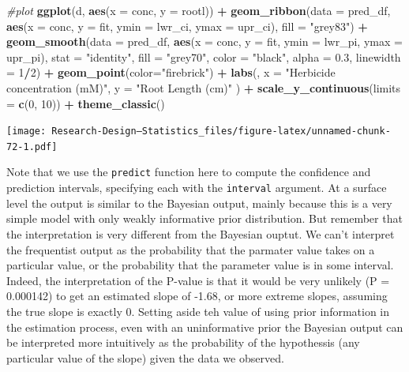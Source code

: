 \documentclass[
]{book}
\newenvironment{Shaded}{\begin{snugshade}}{\end{snugshade}}
\newcommand{\AttributeTok}[1]{\textcolor[rgb]{0.13,0.29,0.53}{#1}}
\newcommand{\CommentTok}[1]{\textcolor[rgb]{0.56,0.35,0.01}{\textit{#1}}}
\newcommand{\DecValTok}[1]{\textcolor[rgb]{0.00,0.00,0.81}{#1}}
\newcommand{\FloatTok}[1]{\textcolor[rgb]{0.00,0.00,0.81}{#1}}
\newcommand{\FunctionTok}[1]{\textcolor[rgb]{0.13,0.29,0.53}{\textbf{#1}}}
\newcommand{\NormalTok}[1]{#1}
\newcommand{\SpecialCharTok}[1]{\textcolor[rgb]{0.81,0.36,0.00}{\textbf{#1}}}
\newcommand{\StringTok}[1]{\textcolor[rgb]{0.31,0.60,0.02}{#1}}
\begin{document}
\begin{Shaded}
\begin{Highlighting}[]
\CommentTok{\#plot}
\FunctionTok{ggplot}\NormalTok{(d, }\FunctionTok{aes}\NormalTok{(}\AttributeTok{x =}\NormalTok{ conc, }\AttributeTok{y =}\NormalTok{ rootl)) }\SpecialCharTok{+}
  \FunctionTok{geom\_ribbon}\NormalTok{(}\AttributeTok{data =}\NormalTok{ pred\_df, }
              \FunctionTok{aes}\NormalTok{(}\AttributeTok{x =}\NormalTok{ conc, }\AttributeTok{y =}\NormalTok{ fit, }\AttributeTok{ymin =}\NormalTok{ lwr\_ci, }\AttributeTok{ymax =}\NormalTok{ upr\_ci),}
              \AttributeTok{fill =} \StringTok{"grey83"}\NormalTok{) }\SpecialCharTok{+}
  \FunctionTok{geom\_smooth}\NormalTok{(}\AttributeTok{data =}\NormalTok{ pred\_df,}
              \FunctionTok{aes}\NormalTok{(}\AttributeTok{x =}\NormalTok{ conc, }\AttributeTok{y =}\NormalTok{ fit, }\AttributeTok{ymin =}\NormalTok{ lwr\_pi, }\AttributeTok{ymax =}\NormalTok{ upr\_pi),}
              \AttributeTok{stat =} \StringTok{"identity"}\NormalTok{,}
              \AttributeTok{fill =} \StringTok{"grey70"}\NormalTok{, }\AttributeTok{color =} \StringTok{"black"}\NormalTok{, }\AttributeTok{alpha =} \FloatTok{0.3}\NormalTok{, }\AttributeTok{linewidth =} \DecValTok{1}\SpecialCharTok{/}\DecValTok{2}\NormalTok{) }\SpecialCharTok{+}
  \FunctionTok{geom\_point}\NormalTok{(}\AttributeTok{color=}\StringTok{"firebrick"}\NormalTok{) }\SpecialCharTok{+}
  \FunctionTok{labs}\NormalTok{(,}
    \AttributeTok{x =} \StringTok{"Herbicide concentration (mM)"}\NormalTok{,}
    \AttributeTok{y =} \StringTok{"Root Length (cm)"}
\NormalTok{  ) }\SpecialCharTok{+}
  \FunctionTok{scale\_y\_continuous}\NormalTok{(}\AttributeTok{limits =} \FunctionTok{c}\NormalTok{(}\DecValTok{0}\NormalTok{, }\DecValTok{10}\NormalTok{)) }\SpecialCharTok{+} 
  \FunctionTok{theme\_classic}\NormalTok{()}
\end{Highlighting}
\end{Shaded}

\texttt{[image: Research-Design---Statistics\_files/figure-latex/unnamed-chunk-72-1.pdf]}

Note that we use the \texttt{predict} function here to compute the confidence and prediction intervals, specifying each with the \texttt{interval} argument. At a surface level the output is similar to the Bayesian output, mainly because this is a very simple model with only weakly informative prior distribution. But remember that the interpretation is very different from the Bayesian ouptut. We can't interpret the frequentist output as the probability that the parmater value takes on a particular value, or the probability that the parameter value is in some interval. Indeed, the interpretation of the P-value is that it would be very unlikely (P = 0.000142) to get an estimated slope of -1.68, or more extreme slopes, assuming the true slope is exactly 0. Setting aside teh value of using prior information in the estimation process, even with an uninformative prior the Bayesian output can be interpreted more intuitively as the probability of the hypothessis (any particular value of the slope) given the data we observed.
\end{document}
